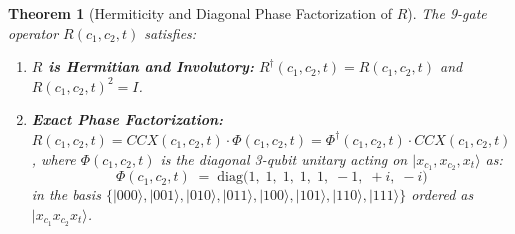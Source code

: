 \documentclass[11pt,a4paper]{article}
\newtheorem{theorem}{Theorem}[section]
\theoremstyle{definition}
\begin{document}
\begin{theorem}[Hermiticity and Diagonal Phase Factorization of $R$]
\label{thm:rccx}
The 9-gate operator $R(c_1, c_2, t)$ satisfies:
\begin{enumerate}
  \item \textbf{$R$ is Hermitian and Involutory:} $R^\dagger(c_1, c_2, t) = R(c_1, c_2, t)$ and $R(c_1, c_2, t)^2 = I$.
  \item \textbf{Exact Phase Factorization:} $R(c_1, c_2, t) = \mathit{CCX}(c_1, c_2, t) \cdot \Phi(c_1, c_2, t) = \Phi^\dagger(c_1, c_2, t) \cdot \mathit{CCX}(c_1, c_2, t)$, where $\Phi(c_1, c_2, t)$ is the diagonal 3-qubit unitary acting on $|x_{c_1}, x_{c_2}, x_t\rangle$ as:
  \[
    \Phi(c_1, c_2, t) \;=\; \mathrm{diag}\big(1,\; 1,\; 1,\; 1,\; 1,\; -1,\; +i,\; -i\big)
  \]
  in the basis $\{|000\rangle, |001\rangle, |010\rangle, |011\rangle, |100\rangle, |101\rangle, |110\rangle, |111\rangle\}$ ordered as $|x_{c_1} x_{c_2} x_t\rangle$.
\end{enumerate}
\end{theorem}
\end{document}
